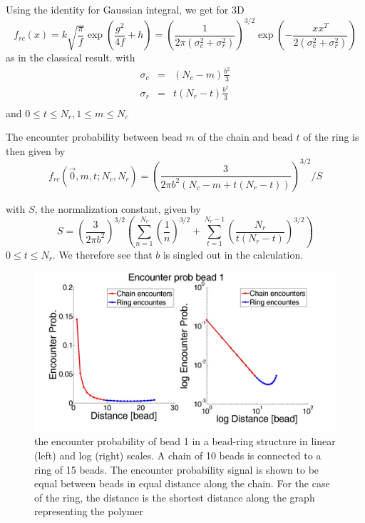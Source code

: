 \documentclass{report}
\begin{document}
Using the identity for Gaussian integral, we get for 3D
\begin{equation*}
f_{rc}(x) = k\sqrt{\frac{\pi}{f}}\exp(\frac{g^2}{4f}+h)=\left(\frac{1}{2\pi(\sigma_c^2 +\sigma_r^2)}\right)^{3/2}\exp\left(-\frac{xx^T}{2(\sigma_c^2+\sigma_r^2)}\right)
\end{equation*}
as in the classical result. with 
\begin{eqnarray*}
\sigma_c &=& (N_c-m)\frac{b^2}{3}\\
\sigma_r &=& t(N_r-t)\frac{b^2}{3}\\
\end{eqnarray*}
and $0 \leq t\leq N_r, 1\leq m\leq N_c$

The encounter probability between bead $m$ of the chain and bead $t$ of the ring is then given by 
\begin{equation*}
f_{rc}(\vec{0},m,t;N_c,N_r)=\left(\frac{3}{2\pi b^2(N_c-m+t(N_r-t))}\right)^{3/2}/S
\end{equation*}

with $S$, the normalization constant, given by 
\begin{equation*}
S= \left(\frac{3}{2\pi b^2}\right)^{3/2}\left(\sum_{n=1}^{N_c} \left(\frac{1}{n}\right)^{3/2}+\sum_{t=1}^{N_r-1} \left(\frac{N_r}{ t(N_r-t)}\right)^{3/2}\right)
\end{equation*}
$0\leq t\leq N_r$. 
We therefore see that $b$ is singled out in the calculation. 
\begin{figure}[h!]
\includegraphics[scale=0.2]{encounterProbChainRingBead1}
\caption{the encounter probability of bead 1 in a bead-ring structure in linear (left) and log (right) scales. A chain of 10 beads is connected to a ring of 15 beads. The encounter probability signal is shown to be equal between beads in equal distance along the chain. For the case of the ring, the distance is the shortest distance along the graph representing the polymer} \label{figure_encounterProbChainRingBead1}
\end{figure}
\end{document}

